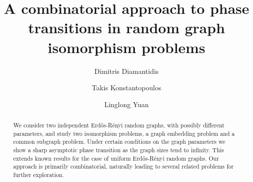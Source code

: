 \documentclass[reqno]{amsart}
\def\red{\color{red}}
\theoremstyle{theorem}
\theoremstyle{definition}
\theoremstyle{remark}
\newcommand{\1}{{\text{\Large $\mathfrak 1$}}}	%
\numberwithin{equation}{section}
\begin{document}


\title[Random graph isomorphisms]{A combinatorial approach to
phase transitions in random graph isomorphism problems}
\author{Dimitris Diamantidis} %
\author{Takis Konstantopoulos} %
\author{Linglong Yuan} %
\address{Math.\ Dept., Univ.\ of Liverpool, UK}





\begin{abstract}
We consider two independent Erd\H{o}s-R\'enyi random graphs,
with possibly different parameters, and study
two isomorphism problems, a graph embedding problem and a common subgraph problem. 
Under certain conditions on the graph parameters we show a sharp
asymptotic phase transition as the graph sizes tend to infinity.
This extends known results for the case of uniform 
Erd\H{o}s-R\'enyi random graphs. 
Our approach is primarily combinatorial, naturally leading to several 
related problems for further exploration.

\end{abstract}
\end{document}

